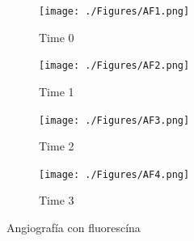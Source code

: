 \begin{figure}[H]
	\centering
	\begin{subfigure}[b]{0.23\textwidth}
        \texttt{[image: ./Figures/AF1.png]}
        \caption{Time 0}
        \label{fig:af1}
    \end{subfigure}
	\begin{subfigure}[b]{0.23\textwidth}
        \texttt{[image: ./Figures/AF2.png]}
        \caption{Time 1}
        \label{fig:af2}
    \end{subfigure}
	\begin{subfigure}[b]{0.23\textwidth}
        \texttt{[image: ./Figures/AF3.png]}
        \caption{Time 2}
        \label{fig:af3}
    \end{subfigure}
    	\begin{subfigure}[b]{0.23\textwidth}
        \texttt{[image: ./Figures/AF4.png]}
        \caption{Time 3}
        \label{fig:af4}
    \end{subfigure}
	\label{fig:retina}
	\caption{Angiograf\'ia con fluoresc\'ina}
\end{figure}

